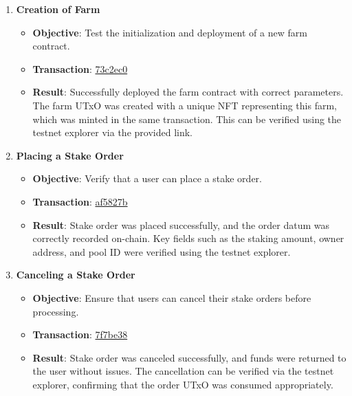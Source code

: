 \documentclass{article}
\begin{document}
\begin{enumerate}
    \item \textbf{Creation of Farm}

    \begin{itemize}
        \item \textbf{Objective}: Test the initialization and deployment of a new farm contract.
        \item \textbf{Transaction}: \href{https://preprod.cexplorer.io/tx/73c2ec0634b09a9d57d6cdca38bf36f4d4d7b3187cce5be8d3b51de66ab40ae2}{73c2ec0}
        \item \textbf{Result}: Successfully deployed the farm contract with correct parameters. The farm UTxO was created with a unique NFT representing this farm, which was minted in the same transaction. This can be verified using the testnet explorer via the provided link.
    \end{itemize}

    \item \textbf{Placing a Stake Order}

    \begin{itemize}
        \item \textbf{Objective}: Verify that a user can place a stake order.
        \item \textbf{Transaction}: \href{https://preprod.cexplorer.io/tx/af5827bdca6cbac144737d87463331cdc89af178921e5e5d26b0a1d48069ab46}{af5827b}
        \item \textbf{Result}: Stake order was placed successfully, and the order datum was correctly recorded on-chain. Key fields such as the staking amount, owner address, and pool ID were verified using the testnet explorer.
    \end{itemize}

    \item \textbf{Canceling a Stake Order}

    \begin{itemize}
        \item \textbf{Objective}: Ensure that users can cancel their stake orders before processing.
        \item \textbf{Transaction}: \href{https://preprod.cexplorer.io/tx/7f7be3818410c28a9c55cc6cf07bb0a413b31e02405f874cea3686317986e29b}{7f7be38}
        \item \textbf{Result}: Stake order was canceled successfully, and funds were returned to the user without issues. The cancellation can be verified via the testnet explorer, confirming that the order UTxO was consumed appropriately.
    \end{itemize}


\end{enumerate}
\end{document}
